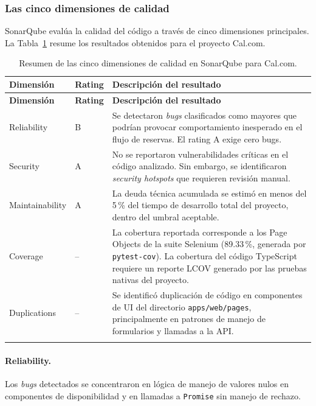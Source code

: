 \documentclass{article}
\begin{document}
\subsubsection{Las cinco dimensiones de calidad}

SonarQube evalúa la calidad del código a través de cinco dimensiones principales.
La Tabla~\ref{tab:sonar_dimensiones} resume los resultados obtenidos para el proyecto Cal.com.

\begin{longtable}{|p{3.2cm}|p{1.8cm}|p{7.5cm}|}
\hline
\textbf{Dimensión} & \textbf{Rating} & \textbf{Descripción del resultado} \\
\hline
\endfirsthead
\hline
\textbf{Dimensión} & \textbf{Rating} & \textbf{Descripción del resultado} \\
\hline
\endhead

Reliability & B & Se detectaron \textit{bugs} clasificados como mayores que podrían provocar comportamiento inesperado en el flujo de reservas. El rating A exige cero bugs. \\
\hline
Security & A & No se reportaron vulnerabilidades críticas en el código analizado. Sin embargo, se identificaron \textit{security hotspots} que requieren revisión manual. \\
\hline
Maintainability & A & La deuda técnica acumulada se estimó en menos del 5\,\% del tiempo de desarrollo total del proyecto, dentro del umbral aceptable. \\
\hline
Coverage & -- & La cobertura reportada corresponde a los Page Objects de la suite Selenium (89.33\,\%, generada por \texttt{pytest-cov}). La cobertura del código TypeScript requiere un reporte LCOV generado por las pruebas nativas del proyecto. \\
\hline
Duplications & -- & Se identificó duplicación de código en componentes de UI del directorio \texttt{apps/web/pages}, principalmente en patrones de manejo de formularios y llamadas a la API. \\
\hline
\caption{Resumen de las cinco dimensiones de calidad en SonarQube para Cal.com.}
\label{tab:sonar_dimensiones}
\end{longtable}

\paragraph{Reliability.}
Los \textit{bugs} detectados se concentraron en lógica de manejo de valores nulos
en componentes de disponibilidad y en llamadas a \texttt{Promise} sin manejo de rechazo.
\end{document}
